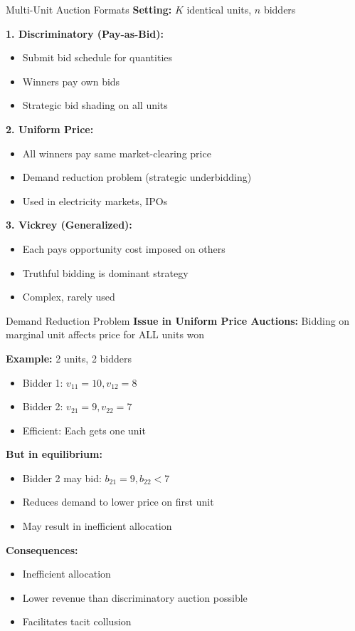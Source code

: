 \documentclass[xcolor={x11names}, aspectratio=169 ]{beamer}
\begin{document}
\begin{frame}{Multi-Unit Auction Formats}
\textbf{Setting:} $K$ identical units, $n$ bidders

\textbf{1. Discriminatory (Pay-as-Bid):}
\begin{itemize}
  \item Submit bid schedule for quantities
  \item Winners pay own bids
  \item Strategic bid shading on all units
\end{itemize}

\textbf{2. Uniform Price:}
\begin{itemize}
  \item All winners pay same market-clearing price
  \item Demand reduction problem (strategic underbidding)
  \item Used in electricity markets, IPOs
\end{itemize}

\textbf{3. Vickrey (Generalized):}
\begin{itemize}
  \item Each pays opportunity cost imposed on others
  \item Truthful bidding is dominant strategy
  \item Complex, rarely used
\end{itemize}
\end{frame}

\begin{frame}{Demand Reduction Problem}
\textbf{Issue in Uniform Price Auctions:}
Bidding on marginal unit affects price for ALL units won

\textbf{Example:} 2 units, 2 bidders
\begin{itemize}
  \item Bidder 1: $v_{11} = 10, v_{12} = 8$
  \item Bidder 2: $v_{21} = 9, v_{22} = 7$
  \item Efficient: Each gets one unit
\end{itemize}

\textbf{But in equilibrium:}
\begin{itemize}
  \item Bidder 2 may bid: $b_{21} = 9, b_{22} < 7$
  \item Reduces demand to lower price on first unit
  \item May result in inefficient allocation
\end{itemize}

\textbf{Consequences:}
\begin{itemize}
  \item Inefficient allocation
  \item Lower revenue than discriminatory auction possible
  \item Facilitates tacit collusion
\end{itemize}
\end{frame}
\end{document}
